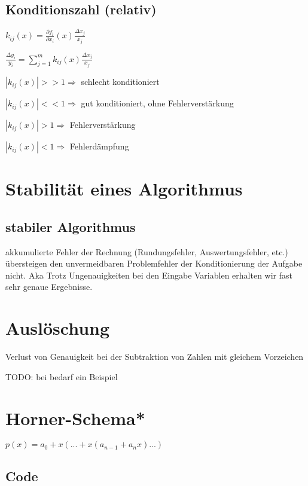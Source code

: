 \documentclass[12pt,a4paper]{article} %
\begin{document}
	\subsection{Konditionszahl (relativ)}
	
	$k_{ij}(x) = \frac{\partial f_i}{\partial x_i}(x) \frac{\Delta x_j}{x_j}$
	
	$\frac{\Delta y_i}{y_i} = \sum_{j = 1}^{m}k_{ij}(x)\frac{\Delta x_j}{x_j}$
	
	$|k_{ij}(x)| >> 1 \Rightarrow$ schlecht konditioniert
	
	$|k_{ij}(x)| << 1 \Rightarrow$ gut konditioniert, ohne Fehlerverstärkung
	
	$|k_{ij}(x)| > 1 \Rightarrow$ Fehlerverstärkung
	
	$|k_{ij}(x)| < 1 \Rightarrow$ Fehlerdämpfung
	
	\newpage
	
	\section{Stabilität eines Algorithmus}
	
	\subsection{stabiler Algorithmus}
	
	akkumulierte Fehler der Rechnung (Rundungsfehler, Auswertungsfehler, etc.) übersteigen den unvermeidbaren Problemfehler der Konditionierung der Aufgabe nicht. Aka Trotz Ungenauigkeiten bei den Eingabe Variablen erhalten wir fast sehr genaue Ergebnisse.
	
	\newpage
	
	\section{Auslöschung}
	
	Verlust von Genauigkeit bei der Subtraktion von Zahlen mit gleichem Vorzeichen
	
	TODO: bei bedarf ein Beispiel
	
	\newpage
	
	\section{Horner-Schema*}
	
	$p(x) = a_0 + x(... + x(a_{n-1} + a_nx)...)$
	
	\subsection{Code}
	
\end{document}
